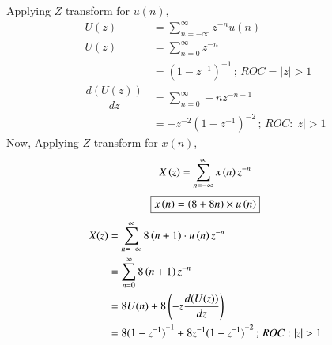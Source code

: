 \documentclass[journal,12pt,twocolumn]{IEEEtran}
\theoremstyle{remark}
\begin{document}
Applying $Z$ transform for $u(n)$,
\begin{align}
    U(z) &= \sum\limits_{n=-\infty}^{\infty}z^{-n}u(n)  \\
    U(z) &= \sum\limits_{n=0}^{\infty}z^{-n}   \\
    &= {(1-{z}^{-1})}^{-1} \, ;\, ROC=|z|>1  \\
    \dfrac{d(U(z))}{dz} &= \sum\limits_{n=0}^{\infty}-nz^{-n-1}   \\
    &=-{z}^{-2} {(1-{z^{-1}})}^{-2} \, ; \, ROC:|z|>1
\end{align}
Now,
Applying $Z$ transform for $x(n)$,
\begin{align}
    X\left(z\right) &= \sum\limits_{n=-\infty}^{\infty}x\left(n\right) z^{-n}   \\
\end{align}
\begin{align}
   \boxed{ x\left(n\right)=\left(8+8n\right) \times u\left(n\right) } 
\end{align}
\begin{align}
    X(z )&= \sum\limits_{n=-\infty}^{\infty} 8\brak{n+1} \cdot u\brak{n} z^{-n}  \\
    &= \sum\limits_{n=0}^{\infty} 8\brak{n+1} z^{-n}    \\
    &= 8U(n)+8\left (-z\dfrac{d(U(z))}{dz}\right )   \\
    &= 8{(1-{z}^{-1})}^{-1}+8{z}^{-1} {(1-{z^{-1}})}^{-2} \, ; \, ROC:|z|>1 
\end{align}

\end{document}
